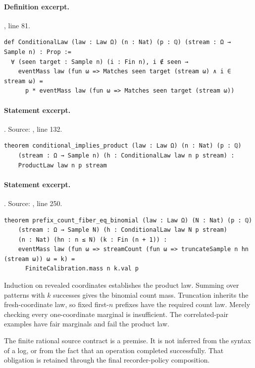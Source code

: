 \documentclass[11pt]{article}
\begin{document}
\paragraph{Definition excerpt.}, line 81.
\begin{lstlisting}[style=AVOCSource]
def ConditionalLaw (law : Law Ω) (n : Nat) (p : ℚ) (stream : Ω → Sample n) : Prop :=
  ∀ (seen target : Sample n) (i : Fin n), i ∉ seen →
    eventMass law (fun ω => Matches seen target (stream ω) ∧ i ∈ stream ω) =
      p * eventMass law (fun ω => Matches seen target (stream ω))
\end{lstlisting}

\paragraph{Statement excerpt.}. Source: , line 132.
\begin{lstlisting}[style=AVOCSource]
theorem conditional_implies_product (law : Law Ω) (n : Nat) (p : ℚ)
    (stream : Ω → Sample n) (h : ConditionalLaw law n p stream) :
    ProductLaw law n p stream
\end{lstlisting}

\paragraph{Statement excerpt.}. Source: , line 250.
\begin{lstlisting}[style=AVOCSource]
theorem prefix_count_fiber_eq_binomial (law : Law Ω) (N : Nat) (p : ℚ)
    (stream : Ω → Sample N) (h : ConditionalLaw law N p stream)
    (n : Nat) (hn : n ≤ N) (k : Fin (n + 1)) :
    eventMass law (fun ω => streamCount (fun ω => truncateSample n hn (stream ω)) ω = k) =
      FiniteCalibration.mass n k.val p
\end{lstlisting}


Induction on revealed coordinates establishes the product law. Summing over
patterns with $k$ successes gives the binomial count mass. Truncation inherits
the fresh-coordinate law, so fixed first-$n$ prefixes have the required count
law. Merely checking every one-coordinate marginal is insufficient. The
correlated-pair examples have fair marginals and fail the product law.

The finite rational source contract is a premise. It is not inferred from the
syntax of a log, or from the fact that an operation completed successfully.
That obligation is retained through the final recorder-policy composition.
\end{document}
